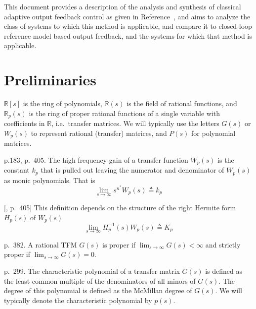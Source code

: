 This document provides a description of the analysis and synthesis of classical adaptive output feedback control as given in Reference~\cite{narendra.stable.2005}, and aims to analyze the class of systems to which this method is applicable, and compare it to closed-loop reference model based output feedback, and the systems for which that method is applicable.

\section{Preliminaries}

$\mathbb{R}[s]$ is the ring of polynomials, $\mathbb{R}(s)$ is the field of rational functions, and $\mathbb{R}_{p}(s)$ is the ring of proper rational functions of a single variable with coefficients in $\mathbb{R}$, i.e.\ transfer matrices.
We will typically use the letters $G(s)$ or $W_{p}(s)$ to represent rational (transfer) matrices, and $P(s)$ for polynomial matrices.

\begin{defn-dan}\cite{narendra.stable.2005}
  p.183, p.~405.
  The high frequency gain of a transfer function $W_{p}(s)$ is the constant $k_{p}$ that is pulled out leaving the numerator and denominator of $W_{p}(s)$ as monic polynomials.
  That is
  \begin{equation*}
  \lim_{s\rightarrow\infty}s^{n^{*}}W_{p}(s)\triangleq k_{p}
  \end{equation*}
\end{defn-dan}

\begin{defn-dan}\label{definition.adaptive.hfgmimo}
  [\cite{narendra.stable.2005}, p.~405]
  This definition depends on the structure of the right Hermite form $H_{p}(s)$ of $W_{p}(s)$
  \begin{equation*}
  \lim_{s\rightarrow\infty}H_{p}^{-1}(s)W_{p}(s)\triangleq K_{p}
  \end{equation*}
\end{defn-dan}

\begin{defn-dan}\cite{kailath.linear.1980}
  p.~382.
  A rational TFM $G(s)$ is proper if $\lim_{s\rightarrow\infty}G(s)<\infty$ and strictly proper if $\lim_{s\rightarrow\infty}G(s)=0$.
\end{defn-dan}

\begin{defn-dan}\label{definition.adaptive.characteristic_polynomial}\cite{antsaklis.linearsystems.2006}
  p.~299.
  The characteristic polynomial of a transfer matrix $G(s)$ is defined as the least common multiple of the denominators of all minors of $G(s)$.
  The degree of this polynomial is defined as the McMillan degree of $G(s)$.
  We will typically denote the characteristic polynomial by $p(s)$.
\end{defn-dan}

